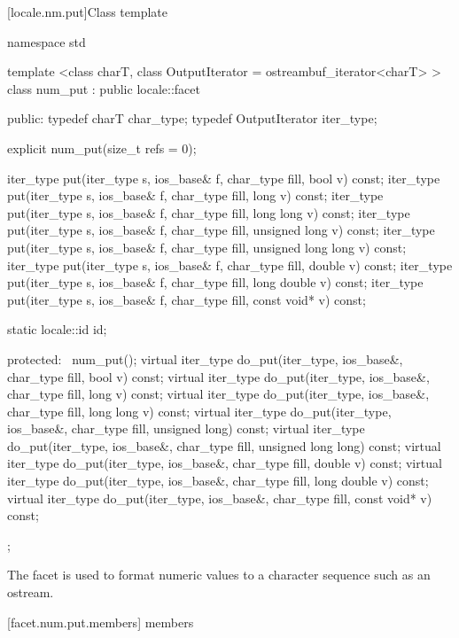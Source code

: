 [locale.nm.put]{Class template }

%
\begin{codeblock}
namespace std {
  template <class charT, class OutputIterator = ostreambuf_iterator<charT> >
  class num_put : public locale::facet {
  public:
    typedef charT            char_type;
    typedef OutputIterator   iter_type;

    explicit num_put(size_t refs = 0);

    iter_type put(iter_type s, ios_base& f, char_type fill, bool v) const;
    iter_type put(iter_type s, ios_base& f, char_type fill, long v) const;
    iter_type put(iter_type s, ios_base& f, char_type fill, long long v) const;
    iter_type put(iter_type s, ios_base& f, char_type fill,
                  unsigned long v) const;
    iter_type put(iter_type s, ios_base& f, char_type fill,
                  unsigned long long v) const;
    iter_type put(iter_type s, ios_base& f, char_type fill,
                  double v) const;
    iter_type put(iter_type s, ios_base& f, char_type fill,
                  long double v) const;
    iter_type put(iter_type s, ios_base& f, char_type fill,
                  const void* v) const;

    static locale::id id;

  protected:
    ~num_put();
    virtual iter_type do_put(iter_type, ios_base&, char_type fill,
                             bool v) const;
    virtual iter_type do_put(iter_type, ios_base&, char_type fill,
                             long v) const;
    virtual iter_type do_put(iter_type, ios_base&, char_type fill,
                             long long v) const;
    virtual iter_type do_put(iter_type, ios_base&, char_type fill,
                             unsigned long) const;
    virtual iter_type do_put(iter_type, ios_base&, char_type fill,
                             unsigned long long) const;
    virtual iter_type do_put(iter_type, ios_base&, char_type fill,
                             double v) const;
    virtual iter_type do_put(iter_type, ios_base&, char_type fill,
                             long double v) const;
    virtual iter_type do_put(iter_type, ios_base&, char_type fill,
                             const void* v) const;
  };
}
\end{codeblock}

\pnum
The facet
is used to format numeric values to a character sequence such as an ostream.

[facet.num.put.members]{ members}

